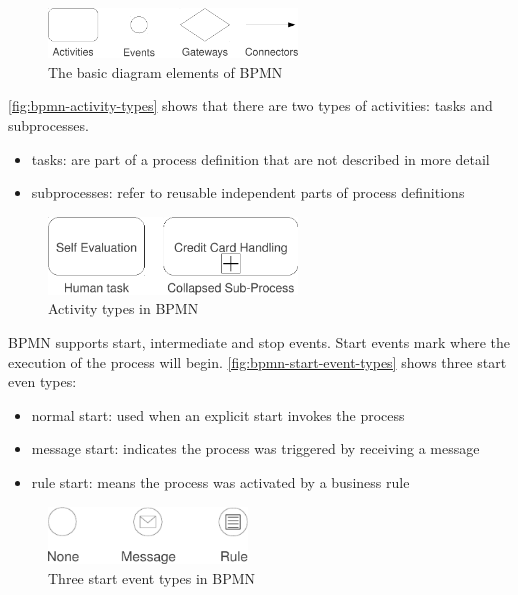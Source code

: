 \begin{figure}[H]
\centering
\includegraphics[width=250px,keepaspectratio]{bpmn-diagram-elements.pdf}
\caption{The basic diagram elements of BPMN}
\label{fig:bpmn-diagram-elements}
\end{figure}

\autoref{fig:bpmn-activity-types} shows that there are two types of activities: tasks and subprocesses.

\begin{itemize}
\item tasks: are part of a process definition that are not described in more detail
\item subprocesses: refer to reusable independent parts of process definitions
\end{itemize}

\begin{figure}[H]
\centering
\includegraphics[width=250px,keepaspectratio]{bpmn-activity-types.pdf}
\caption{Activity types in BPMN}
\label{fig:bpmn-activity-types}
\end{figure}

BPMN supports start, intermediate and stop events. Start events mark where the
execution of the process will begin. \autoref{fig:bpmn-start-event-types}
shows three start even types:

\begin{itemize}
\item normal start: used when an explicit start invokes the process
\item message start: indicates the process was triggered by receiving a message
\item rule start: means the process was activated by a business rule
\end{itemize}

\begin{figure}[H]
\centering
\includegraphics[width=200px,keepaspectratio]{bpmn-start-event-types.pdf}
\caption{Three start event types in BPMN}
\label{fig:bpmn-start-event-types}
\end{figure}

